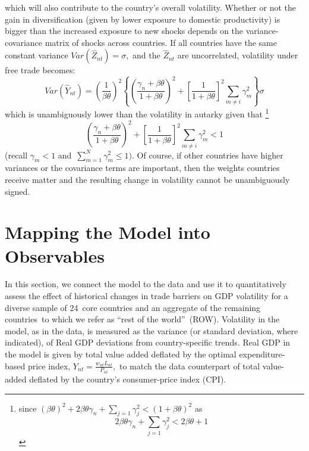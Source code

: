 \documentclass[12pt]{article}
\begin{document}
which will also contribute to the country's overall volatility. Whether or
not the gain in diversification (given by lower exposure to domestic
productivity) is bigger than the increased exposure to new shocks depends on
the variance-covariance matrix of shocks across countries. If all countries
have the same constant variance $Var(\hat{Z}_{nt})=\sigma ,$ and the $\hat{Z}%
_{nt}$ are uncorrelated, volatility under free trade becomes: 
\begin{equation}
Var(\hat{Y}_{nt})=\left( \frac{1}{\beta \theta }\right) ^{2}\left\{ \left( 
\frac{\gamma _{n}+\beta \theta }{1+\beta \theta }\right) ^{2}+\left[ \frac{1%
}{1+\beta \theta }\right] ^{2}\sum_{m\neq i}\gamma _{m}^{2}\right\} \sigma
\end{equation}%
which is unambiguously lower than the volatility in autarky given that%
\footnote{%
since $\left( \beta \theta \right) ^{2}+2\beta \theta \gamma
_{n}+\sum_{j=1}\gamma _{j}^{2}<(1+\beta \theta )^{2}$ as 
\begin{equation*}
2\beta \theta \gamma _{n}+\sum_{j=1}\gamma _{j}^{2}<2\beta \theta +1
\end{equation*}%
} 
\begin{equation}
\left( \frac{\gamma _{n}+\beta \theta }{1+\beta \theta }\right) ^{2}+\left[ 
\frac{1}{1+\beta \theta }\right] ^{2}\sum_{m\neq i}\gamma _{m}^{2}<1
\label{derivelater}
\end{equation}%
(recall $\gamma _{m}<1$ and\ $\sum_{m=1}^{N}\gamma _{m}^{2}\leq 1)$. Of
course, if other countries have higher variances or the covariance terms are
important, then the weights countries receive matter and the resulting
change in volatility cannot be unambiguously signed.

\section{Mapping the Model into Observables}

\label{mapping_into_observables} In this section, we connect the model to
the data and use it to quantitatively assess the effect of historical
changes in trade barriers on GDP volatility for a diverse sample of 24\ core
countries and an aggregate of the remaining countries\ to which we refer as
\textquotedblleft rest of the world\textquotedblright\ (ROW). Volatility in
the model, as in the data, is measured as the variance (or standard
deviation, where indicated), of Real GDP deviations from country-specific
trends. Real GDP in the model is given by total value added deflated by the
optimal expenditure-based price index, $Y_{nt}=\frac{w_{nt}L_{nt}}{P_{nt}},$
to match the data counterpart of total value-added deflated by the country's
consumer-price index (CPI).
\end{document}

